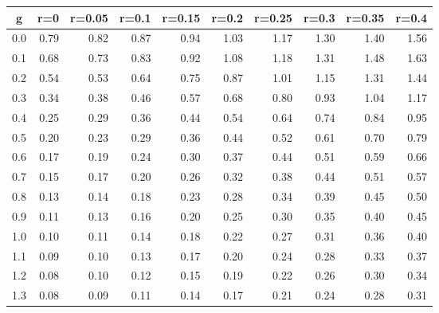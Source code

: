 %
\begin{table}[!tbp]
 \begin{center}
 \begin{tabular}{rrrrrrrrrr}\hline\hline
\multicolumn{1}{c}{g}&\multicolumn{1}{c}{r=0}&\multicolumn{1}{c}{r=0.05}&\multicolumn{1}{c}{r=0.1}&\multicolumn{1}{c}{r=0.15}&\multicolumn{1}{c}{r=0.2}&\multicolumn{1}{c}{r=0.25}&\multicolumn{1}{c}{r=0.3}&\multicolumn{1}{c}{r=0.35}&\multicolumn{1}{c}{r=0.4}\tabularnewline
\hline
0.0&0.79&0.82&0.87&0.94&1.03&1.17&1.30&1.40&1.56\tabularnewline
0.1&0.68&0.73&0.83&0.92&1.08&1.18&1.31&1.48&1.63\tabularnewline
0.2&0.54&0.53&0.64&0.75&0.87&1.01&1.15&1.31&1.44\tabularnewline
0.3&0.34&0.38&0.46&0.57&0.68&0.80&0.93&1.04&1.17\tabularnewline
0.4&0.25&0.29&0.36&0.44&0.54&0.64&0.74&0.84&0.95\tabularnewline
0.5&0.20&0.23&0.29&0.36&0.44&0.52&0.61&0.70&0.79\tabularnewline
0.6&0.17&0.19&0.24&0.30&0.37&0.44&0.51&0.59&0.66\tabularnewline
0.7&0.15&0.17&0.20&0.26&0.32&0.38&0.44&0.51&0.57\tabularnewline
0.8&0.13&0.14&0.18&0.23&0.28&0.34&0.39&0.45&0.50\tabularnewline
0.9&0.11&0.13&0.16&0.20&0.25&0.30&0.35&0.40&0.45\tabularnewline
1.0&0.10&0.11&0.14&0.18&0.22&0.27&0.31&0.36&0.40\tabularnewline
1.1&0.09&0.10&0.13&0.17&0.20&0.24&0.28&0.33&0.37\tabularnewline
1.2&0.08&0.10&0.12&0.15&0.19&0.22&0.26&0.30&0.34\tabularnewline
1.3&0.08&0.09&0.11&0.14&0.17&0.21&0.24&0.28&0.31\tabularnewline
\hline
\end{tabular}

\end{center}

\end{table}

